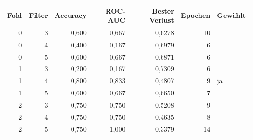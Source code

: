 \begin{tabular}{rrrrrrl}
\toprule
Fold & Filter & Accuracy & ROC-AUC & Bester Verlust & Epochen & Gewählt \\
\midrule
0 & 3 & 0,600 & 0,667 & 0,6278 & 10 &  \\
0 & 4 & 0,400 & 0,167 & 0,6979 & 6 &  \\
0 & 5 & 0,600 & 0,667 & 0,6871 & 6 &  \\
1 & 3 & 0,200 & 0,167 & 0,7309 & 6 &  \\
1 & 4 & 0,800 & 0,833 & 0,4807 & 9 & ja \\
1 & 5 & 0,600 & 0,667 & 0,6650 & 7 &  \\
2 & 3 & 0,750 & 0,750 & 0,5208 & 9 &  \\
2 & 4 & 0,750 & 0,750 & 0,4635 & 8 &  \\
2 & 5 & 0,750 & 1,000 & 0,3379 & 14 &  \\
\bottomrule
\end{tabular}
